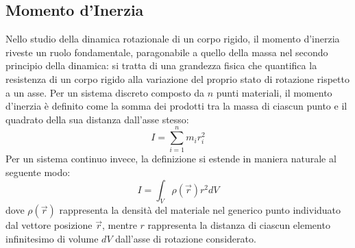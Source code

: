 \subsection{Momento d'Inerzia}
Nello studio della dinamica rotazionale di un corpo rigido, il momento d'inerzia riveste un ruolo fondamentale, paragonabile a quello della massa nel secondo principio della dinamica: si tratta di una grandezza fisica che quantifica la resistenza di un corpo rigido alla variazione del proprio stato di rotazione rispetto a un asse. Per un sistema discreto composto da $n$ punti materiali, il momento d'inerzia è definito come la somma dei prodotti tra la massa di ciascun punto e il quadrato della sua distanza dall'asse stesso:
\begin{equation}
    I = \sum_{i=1}^{n}m_ir_i^2
\end{equation}
Per un sistema continuo invece, la definizione si estende in maniera naturale al seguente modo:
\begin{equation}
    I = \int_{V}\rho(\vec{r})r^2dV
\end{equation}
dove $\rho(\vec{r})$ rappresenta la densità del materiale nel generico punto individuato dal vettore posizione $\vec{r}$, mentre $r$ rappresenta la distanza di ciascun elemento infinitesimo di volume 
$dV$ dall'asse di rotazione considerato.


